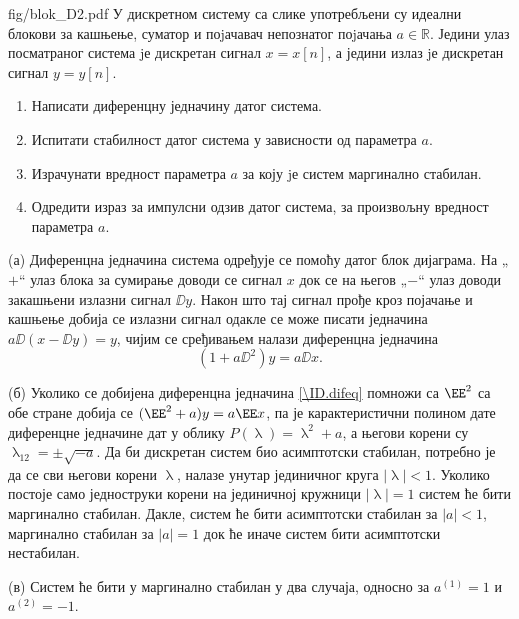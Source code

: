 \begin{slikaDesno}{fig/blok_D2.pdf}
    \PID У дискретном систему са слике употребљени су идеални блокови за кашњење,
    суматор и поjачавач непознатог поjачања $a \in \mathbb R$. 
    Једини улаз посматраног
    система jе дискретан сигнал $x = x[n]$, а једини излаз jе дискретан сигнал $y = y[n]$.
\end{slikaDesno}
\begin{enumerate}[label=(\alph*)]
    \item Написати диференцну једначину датог система.
    \item Испитати  стабилност датог система у зависности од параметра $a$.
    \item Израчунати вредност параметра $a$ за коју jе систем маргинално стабилан.
    \item Одредити израз за импулсни одзив датог система, за произвољну вредност параметра $a$.
\end{enumerate}

\RESENJE
(а) Диференцна једначина система одређује се помоћу датог блок дијаграма. На „$+$“ улаз блока за сумирање 
доводи се сигнал $x$ док се на његов „$-$“ улаз доводи закашњени излазни сигнал $\DD y$. Након што 
тај сигнал прође кроз појачање и кашњење добија се излазни сигнал одакле се може писати 
једначина $a \DD ( x - \DD y) = y$, чијим се сређивањем налази диференцна једначина 
\begin{equation}
    (1 + a \DD^2) y = a \DD x. \label{\ID.difeq}
\end{equation}

(б) Уколико се добијена диференцна једначина \eqref{\ID.difeq} помножи са $\EE^2$ са обе стране добија се 
$(\EE^2 + a)y = a \EE x$, па је карактеристични полином дате диференцне једначине дат у облику 
$P(\uplambda) = \uplambda^2 + a$, а његови корени су 
$\uplambda_{12} = \pm \sqrt{-a}$. Да би дискретан систем био асимптотски стабилан, потребно је да се сви његови 
корени $\uplambda$, налазе унутар јединичног круга $|\uplambda| < 1$. Уколико постоје само 
једноструки корени на јединичној 
кружници $|\uplambda| = 1$ систем ће бити маргинално стабилан. 
Дакле, систем ће бити асимптотски стабилан за $|a| < 1$, маргинално стабилан за $|a| = 1$ док ће иначе 
систем бити асимптотски нестабилан.

(в) Систем ће бити у маргинално стабилан у два случаја, односно за $a^{(1)} = 1$ и $a^{(2)} = -1$.  

